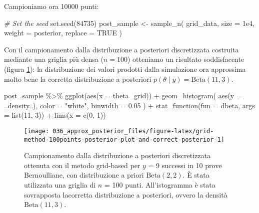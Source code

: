 \documentclass[
]{memoir}
\newenvironment{Shaded}{\begin{snugshade}}{\end{snugshade}}
\newcommand{\AttributeTok}[1]{\textcolor[rgb]{0.77,0.63,0.00}{#1}}
\newcommand{\CommentTok}[1]{\textcolor[rgb]{0.56,0.35,0.01}{\textit{#1}}}
\newcommand{\ConstantTok}[1]{\textcolor[rgb]{0.00,0.00,0.00}{#1}}
\newcommand{\DecValTok}[1]{\textcolor[rgb]{0.00,0.00,0.81}{#1}}
\newcommand{\FloatTok}[1]{\textcolor[rgb]{0.00,0.00,0.81}{#1}}
\newcommand{\FunctionTok}[1]{\textcolor[rgb]{0.00,0.00,0.00}{#1}}
\newcommand{\NormalTok}[1]{#1}
\newcommand{\OtherTok}[1]{\textcolor[rgb]{0.56,0.35,0.01}{#1}}
\newcommand{\SpecialCharTok}[1]{\textcolor[rgb]{0.00,0.00,0.00}{#1}}
\newcommand{\StringTok}[1]{\textcolor[rgb]{0.31,0.60,0.02}{#1}}
\begin{document}
\noindent
Campioniamo ora 10000 punti:

\begin{Shaded}
\begin{Highlighting}[]
\CommentTok{\# Set the seed}
\FunctionTok{set.seed}\NormalTok{(}\DecValTok{84735}\NormalTok{)}
\NormalTok{post\_sample }\OtherTok{\textless{}{-}} \FunctionTok{sample\_n}\NormalTok{(}
\NormalTok{  grid\_data,}
  \AttributeTok{size =} \FloatTok{1e4}\NormalTok{,}
  \AttributeTok{weight =}\NormalTok{ posterior,}
  \AttributeTok{replace =} \ConstantTok{TRUE}
\NormalTok{)}
\end{Highlighting}
\end{Shaded}

\noindent
Con il campionamento dalla distribuzione a posteriori discretizzata costruita mediante una griglia più densa (\(n = 100\)) otteniamo un risultato soddisfacente (figura \ref{fig:grid-method-100points-posterior-plot-and-correct-posterior}): la distribuzione dei valori prodotti dalla simulazione ora approssima molto bene la corretta distribuzione a posteriori \(p(\theta \mid y) = \mbox{Beta}(11, 3)\).

\begin{Shaded}
\begin{Highlighting}[]
\NormalTok{post\_sample }\SpecialCharTok{\%\textgreater{}\%}
  \FunctionTok{ggplot}\NormalTok{(}\FunctionTok{aes}\NormalTok{(}\AttributeTok{x =}\NormalTok{ theta\_grid)) }\SpecialCharTok{+}
  \FunctionTok{geom\_histogram}\NormalTok{(}
    \FunctionTok{aes}\NormalTok{(}\AttributeTok{y =}\NormalTok{ ..density..), }
    \AttributeTok{color =} \StringTok{"white"}\NormalTok{, }
    \AttributeTok{binwidth =} \FloatTok{0.05}
\NormalTok{  ) }\SpecialCharTok{+}
  \FunctionTok{stat\_function}\NormalTok{(}\AttributeTok{fun =}\NormalTok{ dbeta, }\AttributeTok{args =} \FunctionTok{list}\NormalTok{(}\DecValTok{11}\NormalTok{, }\DecValTok{3}\NormalTok{)) }\SpecialCharTok{+}
  \FunctionTok{lims}\NormalTok{(}\AttributeTok{x =} \FunctionTok{c}\NormalTok{(}\DecValTok{0}\NormalTok{, }\DecValTok{1}\NormalTok{))}
\end{Highlighting}
\end{Shaded}

\begin{figure}

{\centering \texttt{[image: 036\_approx\_posterior\_files/figure-latex/grid-method-100points-posterior-plot-and-correct-posterior-1]} 

}

\caption{Campionamento dalla  distribuzione a posteriori discretizzata ottenuta con il metodo grid-based per $y$ = 9 successi in 10 prove Bernoulliane, con distribuzione a priori $\mbox{Beta}(2, 2)$. È stata utilizzata una griglia di $n$ = 100 punti. All'istogramma è stata sovrapposta lacorretta distribuzione a posteriori, ovvero la densità $\mbox{Beta}(11, 3)$.}\label{fig:grid-method-100points-posterior-plot-and-correct-posterior}
\end{figure}
\end{document}
